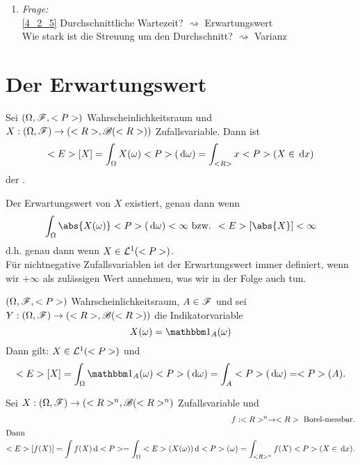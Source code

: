 \begin{enumerate}
	\item \emph{Frage:} \\
	\cref{4_2_5} Durchschnittliche Wartezeit? $\rightsquigarrow$ Erwartungswert\\
	Wie stark ist die Streuung um den Durchschnitt? $\rightsquigarrow$ Varianz
\end{enumerate}
\section{Der Erwartungswert}
\begin{definition}[Erwartungswert]
	Sei $(\Omega, \mathscr F, <P>)$ Wahrscheinlichkeitsraum und $X: (\Omega, \mathscr F) \to (<R>, \mathscr{B}(<R>))$ Zufallsvariable. Dann ist
	\begin{align*}
		<E>[X] = \int_{\Omega} X(\omega) <P>(\,\mathrm{d} \omega) = \int_{<R>} x <P>(X  \in \,\mathrm{d} x)
	\end{align*}
	der .
\end{definition}
\begin{*hint}
	Der Erwartungswert von $X$ existiert, genau dann wenn
	\begin{align*}
		\int_{\O} \abs{X(\omega)}\P(\d \omega) < \infty \bzw \E[\abs{X}] < \infty
	\end{align*}
	d.h. genau dann wenn $X \in \mathcal{L}^{1} (<P>)$.\\
	Für nichtnegative Zufallsvariablen ist der Erwartungswert immer definiert, wenn wir $+\infty$ als zulässigen Wert annehmen, was wir in der Folge auch tun.
\end{*hint}
\begin{example}
	$(\Omega, \mathscr F, <P>)$ Wahrscheinlichkeitsraum, $A \in \mathscr F$ und sei $Y: (\Omega, \mathscr F) \to (<R>, \mathscr{B}(<R>))$ die Indikatorvariable
	\[
		X(\omega) = \indi_{A} (\omega)
	\]
	Dann gilt: $X \in \mathcal{L}^{1}(<P>)$ und
	\begin{align*}
		\E[X] = \int_{\O} \indi_{A} (\omega) \P(\d \omega) = \int_{A} \P(\d \omega) = \P(A).
	\end{align*}
\end{example}
\begin{proposition}
	Sei $X: (\Omega, \mathscr F) \to (<R>^n, \mathscr{B}(<R>^n)$ Zufallsvariable und
	\begin{align*}
		f: <R>^n \to <R> \text{ Borel-messbar}.\\
		\intertext{Dann}
		<E>[f(X)] = \int f(X)\,\mathrm{d} <P> = \int_{\Omega} <E>(X(\omega)) \,\mathrm{d} <P>(\omega) = \int_{<R>^n} f(X) <P>(X \in \,\mathrm{d} x). 
	\end{align*}
\end{proposition}
